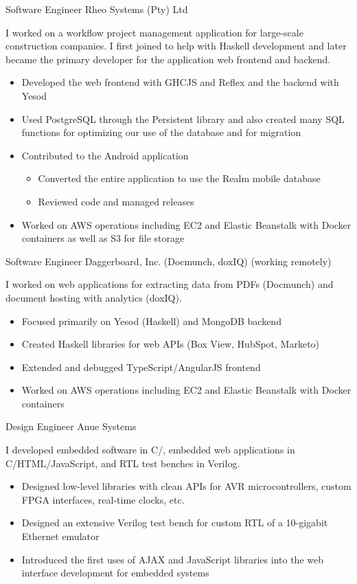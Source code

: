 \documentclass[11pt,a4paper,roman]{moderncv}
\begin{document}
\professionentry%
{}%
{Software Engineer}%
{Rheo Systems (Pty) Ltd}%
{\pretoria}%
{}%
{I worked on a workflow project management application for large-scale construction companies. I first joined to help with Haskell development and later became the primary developer for the application web frontend and backend.
\begin{itemize}[leftmargin=2em,nosep]
\item Developed the web frontend with GHCJS and Reflex and the backend with Yesod
\item Used PostgreSQL through the Persistent library and also created many SQL functions for optimizing our use of the database and for migration
\item Contributed to the Android application
  \begin{itemize}[leftmargin=2em,nosep]
  \item Converted the entire application to use the Realm mobile database
  \item Reviewed code and managed releases
  \end{itemize}
\item Worked on AWS operations including EC2 and Elastic Beanstalk with Docker containers as well as S3 for file storage
\end{itemize}}

\professionentry%
{}%
{Software Engineer}%
{Daggerboard, Inc. (Docmunch, doxIQ)}%
{\sanfrancisco{} (working remotely)}%
{}%
{I worked on web applications for extracting data from PDFs (Docmunch) and document hosting with analytics (doxIQ).
\begin{itemize}[leftmargin=2em,nosep]
\item Focused primarily on Yesod (Haskell) and MongoDB backend
\item Created Haskell libraries for web APIs (Box View, HubSpot, Marketo)
\item Extended and debugged TypeScript/AngularJS frontend
\item Worked on AWS operations including EC2 and Elastic Beanstalk with Docker containers
\end{itemize}}

\professionentry%
{}%
{Design Engineer}%
{Anue Systems}%
{\austin}%
{}%
{I developed embedded software in C/\cpplang{}, embedded web applications in C/HTML/JavaScript, and RTL test benches in Verilog.
\begin{itemize}[leftmargin=2em,nosep]
\item Designed low-level libraries with clean APIs for AVR microcontrollers, custom FPGA interfaces, real-time clocks, etc.
\item Designed an extensive Verilog test bench for custom RTL of a 10-gigabit Ethernet emulator
\item Introduced the first uses of AJAX and JavaScript libraries into the web interface development for embedded systems
\end{itemize}}
\end{document}
